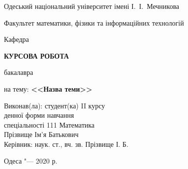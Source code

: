 \thispagestyle{empty}

\begin{center}
Одеський національний університет імені І.~І.~Мечникова

Факультет математики, фізики та інформаційних технологій

Кафедра %
\end{center}

\vfill

\begin{center}
\large
\textbf{КУРСОВА РОБОТА}

бакалавра

\bigskip

на тему: \textbf{<<Назва теми>>}
\end{center}

\vspace{2cm}

\hfill
\begin{minipage}{0.6\textwidth}
Виконав(ла): студент(ка) II курсу\\
денної форми навчання\\
спеціальності 111 Математика\\ %
Прізвище Ім'я Батькович\\[3\jot]
Керівник: наук. ст., вч. зв. Прізвище І. Б.
\end{minipage}

\vfill

\begin{center}
Одеса "--- 2020 р.
\end{center}